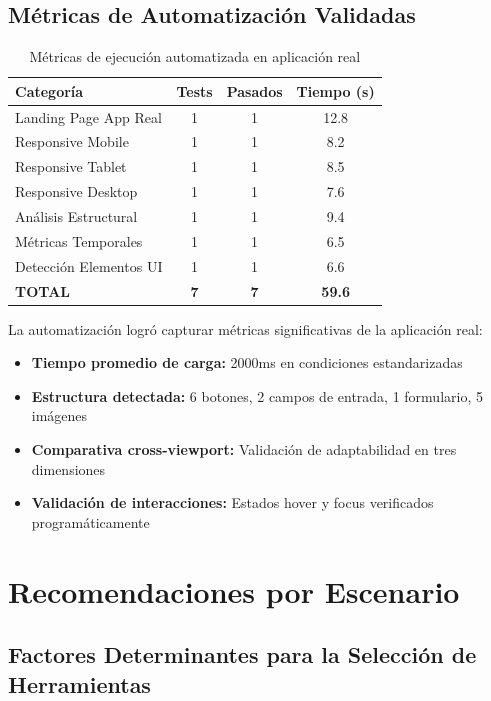 \documentclass{article}
\begin{document}
\subsection{Métricas de Automatización Validadas}

\begin{table}[H]
\centering
\begin{tabular}{|l|c|c|c|}
\hline
\textbf{Categoría} & \textbf{Tests} & \textbf{Pasados} & \textbf{Tiempo (s)} \\
\hline
Landing Page App Real & 1 & 1 & 12.8 \\
Responsive Mobile & 1 & 1 & 8.2 \\
Responsive Tablet & 1 & 1 & 8.5 \\
Responsive Desktop & 1 & 1 & 7.6 \\
Análisis Estructural & 1 & 1 & 9.4 \\
Métricas Temporales & 1 & 1 & 6.5 \\
Detección Elementos UI & 1 & 1 & 6.6 \\
\hline
\textbf{TOTAL} & \textbf{7} & \textbf{7} & \textbf{59.6} \\
\hline
\end{tabular}
\caption{Métricas de ejecución automatizada en aplicación real}
\label{tab:automation-metrics}
\end{table}

La automatización logró capturar métricas significativas de la aplicación real:
\begin{itemize}[nosep]
\item \textbf{Tiempo promedio de carga:} 2000ms en condiciones estandarizadas
\item \textbf{Estructura detectada:} 6 botones, 2 campos de entrada, 1 formulario, 5 imágenes
\item \textbf{Comparativa cross-viewport:} Validación de adaptabilidad en tres dimensiones
\item \textbf{Validación de interacciones:} Estados hover y focus verificados programáticamente
\end{itemize}

\section{Recomendaciones por Escenario}

\subsection{Factores Determinantes para la Selección de Herramientas}
\end{document}
